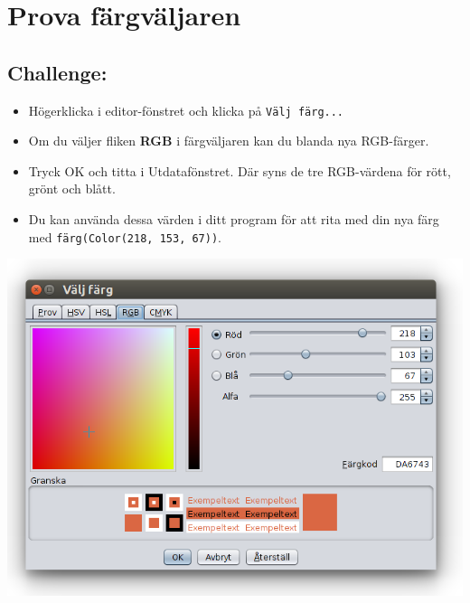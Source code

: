 \chapter{Prova färgväljaren}
\begin{multicols}{2}
\section*{\color{BrickRed}Challenge:}


\begin{itemize}

\item {Högerklicka i editor-fönstret och klicka på \lstinline{Välj färg...}}
\item {Om du väljer fliken {\bf RGB} i färgväljaren kan du blanda nya RGB-färger.}
\item {Tryck OK och titta i Utdatafönstret. Där syns de tre RGB-värdena för rött, grönt och blått.}
\item {Du kan använda dessa värden i ditt program för att rita med din nya färg med \lstinline{färg(Color(218, 153, 67))}.}

\end{itemize}



\columnbreak

\begin{center}
\includegraphics[width=14.0cm]{../img/color-chooser-rgb-sv.png}
\end{center}

\end{multicols}

